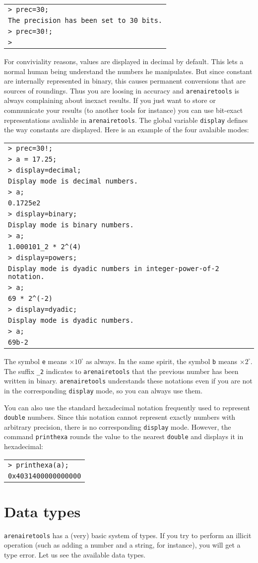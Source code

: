 \documentclass[a4paper]{article}
\newcommand{\com}[1]{\texttt{#1}}
\newcommand{\key}[1]{\texttt{#1}}
\newcommand{\arenairetools}{\texttt{arenairetools}\xspace}
\newcommand{\code}[1]{\begin{center}
\begin{tabular}{|p{14.8cm}|}
\hline
#1
\hline
\end{tabular}
\end{center}
}
\newcommand{\ligne}[1]{\texttt{#1}\\}
\begin{document}
\code{
\ligne{> prec=30;}
\ligne{The precision has been set to 30 bits.}
\ligne{> prec=30!;}
\ligne{>}
}

For conviviality reasons, values are displayed in decimal by default. This lets a normal human being understand the numbers he manipulates. But since constant are internally represented in binary, this causes permanent conversions that are sources of roundings. Thus you are loosing in accuracy and \arenairetools is always complaining about inexact results. If you just want to store or communicate your results (to another tools for instance) you can use bit-exact representations avaliable in \arenairetools. The global variable \key{display} defines the way constants are displayed. Here is an example of the four avalaible modes:


\code{
\ligne{> prec=30!;}
\ligne{> a = 17.25;}
\ligne{> display=decimal;}
\ligne{Display mode is decimal numbers.}
\ligne{> a;}
\ligne{0.1725e2}
\ligne{> display=binary;}
\ligne{Display mode is binary numbers.}
\ligne{> a;}
\ligne{1.000101\_2 * 2\^{}(4)}
\ligne{> display=powers;}
\ligne{Display mode is dyadic numbers in integer-power-of-2 notation.}
\ligne{> a;}
\ligne{69 * 2\^{}(-2)}
\ligne{> display=dyadic;}
\ligne{Display mode is dyadic numbers.}
\ligne{> a;}
\ligne{69b-2}
}

The symbol \texttt{e} means $\times 10^\square $ as always. In the same spirit, the symbol \texttt{b} means  $\times 2^\square $. The suffix \texttt{\_2} indicates to \arenairetools that the previous number has been written in binary. \arenairetools understands these notations even if you are not in the corresponding \key{display} mode, so you can always use them.

You can also use the standard hexadecimal notation frequently used to represent \texttt{double} numbers. Since this notation cannot represent exactly numbers with arbitrary precision, there is no corresponding \key{display} mode. However, the command \com{printhexa} rounds the value to the nearest \texttt{double} and displays it in hexadecimal:

\code{
\ligne{> printhexa(a);}
\ligne{0x4031400000000000}
}

\section{Data types}
\arenairetools has a (very) basic system of types. If you try to perform an illicit operation (such as adding a number and a string, for instance), you will get a type error. Let us see the available data types.
\end{document}
